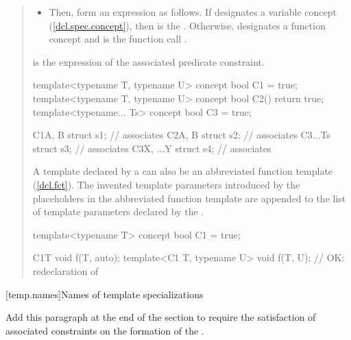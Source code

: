 \begin{quote}
\begin{itemize}
\item Then, form an expression  as follows. If  designates
a variable concept (\ref{dcl.spec.concept}), then  is the
. Otherwise,  designates a function concept and
 is the function call .
\end{itemize}
% 
 is the expression of the associated predicate constraint.
% 
\enterexample
\begin{codeblock}
template<typename T, typename U> concept bool C1 = true;
template<typename T, typename U> concept bool C2() { return true; }
template<typename... Ts> concept bool C3 = true;

C1{A, B} struct s1;    // associates 
C2{A, B} struct s2;    // associates 
C3{...Ts} struct s3;   // associates 
C3{X, ...Y} struct s4; // associates 
\end{codeblock}
\exitexample

\pnum
A template declared by a  can also be 
an abbreviated function template (\ref{dcl.fct}). 
% 
The invented template parameters introduced by the placeholders in the 
abbreviated function template are appended to the list of template parameters 
declared by the .
% 
\enterexample
\begin{codeblock}
template<typename T> concept bool C1 = true;

C1{T} void f(T, auto);
template<C1 T, typename U> void f(T, U); // OK: redeclaration of 
\end{codeblock}
% 
\exitexample
\end{quote}


[temp.names]{Names of template specializations}

Add this paragraph at the end of the section to require the satisfaction of 
associated constraints on the formation of the .

